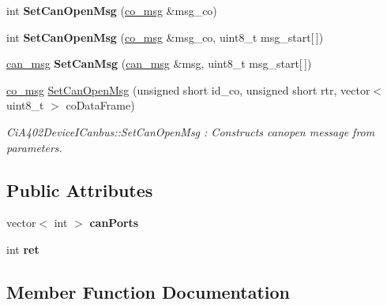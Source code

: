 \begin{DoxyCompactItemize}
int {\bfseries Set\+Can\+Open\+Msg} (\hyperlink{structco__msg}{co\+\_\+msg} \&msg\+\_\+co)
\item 
\mbox{\label{classCiA402DeviceICanbus_af09467b107e73f67804942db1597d983}} 
int {\bfseries Set\+Can\+Open\+Msg} (\hyperlink{structco__msg}{co\+\_\+msg} \&msg\+\_\+co, uint8\+\_\+t msg\+\_\+start\mbox{[}$\,$\mbox{]})
\item 
\mbox{\label{classCiA402DeviceICanbus_a93cde3041c3d0a26666b451aa70b246f}} 
\hyperlink{structcan__msg}{can\+\_\+msg} {\bfseries Set\+Can\+Msg} (\hyperlink{structcan__msg}{can\+\_\+msg} \&msg, uint8\+\_\+t msg\+\_\+start\mbox{[}$\,$\mbox{]})
\item 
\hyperlink{structco__msg}{co\+\_\+msg} \hyperlink{classCiA402DeviceICanbus_ab861fc4d62c917bdb1c06b886c8ed45a}{Set\+Can\+Open\+Msg} (unsigned short id\+\_\+co, unsigned short rtr, vector$<$ uint8\+\_\+t $>$ co\+Data\+Frame)
\begin{DoxyCompactList}\small\item\em Ci\+A402\+Device\+I\+Canbus\+::\+Set\+Can\+Open\+Msg \+: Constructs canopen message from parameters. \end{DoxyCompactList}\end{DoxyCompactItemize}
\subsection*{Public Attributes}
\begin{DoxyCompactItemize}
\item 
\mbox{\label{classCiA402DeviceICanbus_a456534a394e4072025f2528938d1070d}} 
vector$<$ int $>$ {\bfseries can\+Ports}
\item 
\mbox{\label{classCiA402DeviceICanbus_af6cf1493b669ce0415cefed7d84e5710}} 
int {\bfseries ret}
\end{DoxyCompactItemize}


\subsection{Member Function Documentation}
\mbox{\label{classCiA402DeviceICanbus_ab861fc4d62c917bdb1c06b886c8ed45a}} 
